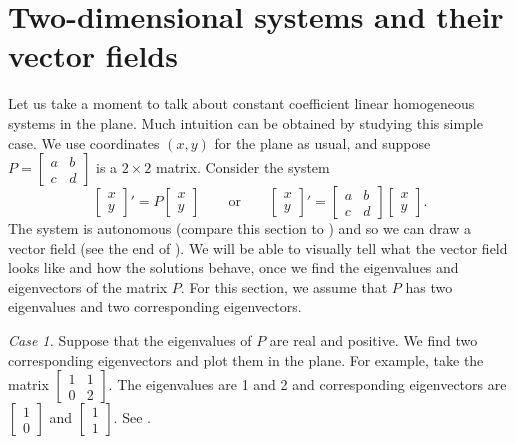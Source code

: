 
\sectionnewpage
\section{Two-dimensional systems and their vector fields}
\label{sec:twodimaut}


Let us take a moment to talk about constant coefficient linear
homogeneous systems in the plane.
Much intuition can be obtained by studying this simple case.
We use coordinates $(x,y)$ for the plane as usual,
and suppose
$P = \left[ \begin{smallmatrix} a & b \\ c & d \end{smallmatrix} \right]$ 
is a $2 \times 2$ matrix.  Consider the system
\begin{equation} \label{pln:eq}
\begin{bmatrix} x \\ y \end{bmatrix} ' =
P \begin{bmatrix} x \\ y \end{bmatrix} 
\qquad 
\text{or}
\qquad
\begin{bmatrix} x \\ y \end{bmatrix} ' =
\begin{bmatrix} a & b \\ c & d \end{bmatrix} 
\begin{bmatrix} x \\ y \end{bmatrix} 
.
\end{equation}
The system is autonomous (compare this section
to )
and so we can draw a vector field (see the end of
).
We will be able to visually tell what the vector field looks like and
how the solutions behave, once we find 
the eigenvalues and eigenvectors of the matrix $P$.
For this section,
we assume that $P$ has two eigenvalues and two corresponding
eigenvectors.

\medskip

\emph{Case 1.}  Suppose that the eigenvalues of $P$ are real and positive.
We find two corresponding eigenvectors and plot them in the plane.  For
example, take the
matrix $\left[ \begin{smallmatrix} 1 & 1 \\ 0 & 2 \end{smallmatrix}
\right]$.
The eigenvalues are 1 and 2 and corresponding eigenvectors are
$\left[ \begin{smallmatrix} 1 \\ 0 \end{smallmatrix} \right]$ and
$\left[ \begin{smallmatrix} 1 \\ 1 \end{smallmatrix} \right]$.  See
.

